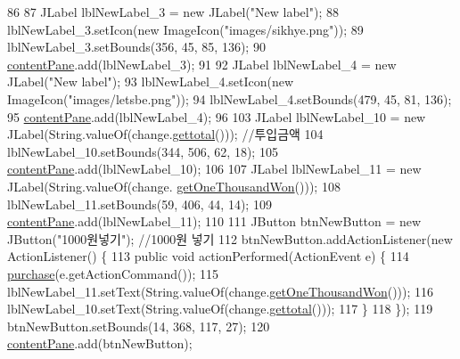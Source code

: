 \begin{DoxyCode}
86         
87         JLabel lblNewLabel\_3 = \textcolor{keyword}{new} JLabel(\textcolor{stringliteral}{"New label"});
88         lblNewLabel\_3.setIcon(\textcolor{keyword}{new} ImageIcon(\textcolor{stringliteral}{"images/sikhye.png"}));
89         lblNewLabel\_3.setBounds(356, 45, 85, 136);
90         \hyperlink{class_vending_machine_1_1_machine_u_i_ac8ef25585e46da798d067af0eefa1a03}{contentPane}.add(lblNewLabel\_3);
91         
92         JLabel lblNewLabel\_4 = \textcolor{keyword}{new} JLabel(\textcolor{stringliteral}{"New label"});
93         lblNewLabel\_4.setIcon(\textcolor{keyword}{new} ImageIcon(\textcolor{stringliteral}{"images/letsbe.png"}));
94         lblNewLabel\_4.setBounds(479, 45, 81, 136);
95         \hyperlink{class_vending_machine_1_1_machine_u_i_ac8ef25585e46da798d067af0eefa1a03}{contentPane}.add(lblNewLabel\_4);  
96         
103         JLabel lblNewLabel\_10 = \textcolor{keyword}{new} JLabel(String.valueOf(change.\hyperlink{class_vending_machine_1_1_change_a07a32d7240178343fa1273d075d73c64}{gettotal}())); \textcolor{comment}{//투입금액}
104         lblNewLabel\_10.setBounds(344, 506, 62, 18);
105         \hyperlink{class_vending_machine_1_1_machine_u_i_ac8ef25585e46da798d067af0eefa1a03}{contentPane}.add(lblNewLabel\_10);     
106         
107         JLabel lblNewLabel\_11 = \textcolor{keyword}{new} JLabel(String.valueOf(change.
      \hyperlink{class_vending_machine_1_1_change_a4207ff32f227afb89076b87a3812cf2e}{getOneThousandWon}()));
108         lblNewLabel\_11.setBounds(59, 406, 44, 14);
109         \hyperlink{class_vending_machine_1_1_machine_u_i_ac8ef25585e46da798d067af0eefa1a03}{contentPane}.add(lblNewLabel\_11);
110         
111         JButton btnNewButton = \textcolor{keyword}{new} JButton(\textcolor{stringliteral}{"1000원넣기"}); \textcolor{comment}{//1000원 넣기}
112         btnNewButton.addActionListener(\textcolor{keyword}{new} ActionListener() \{
113             \textcolor{keyword}{public} \textcolor{keywordtype}{void} actionPerformed(ActionEvent e) \{
114                 \hyperlink{class_vending_machine_1_1_machine_u_i_aadccf593dc69281c9ebbfe1fbe09b804}{purchase}(e.getActionCommand());
115                 lblNewLabel\_11.setText(String.valueOf(change.\hyperlink{class_vending_machine_1_1_change_a4207ff32f227afb89076b87a3812cf2e}{getOneThousandWon}()));
116                 lblNewLabel\_10.setText(String.valueOf(change.\hyperlink{class_vending_machine_1_1_change_a07a32d7240178343fa1273d075d73c64}{gettotal}()));
117             \}
118         \});
119         btnNewButton.setBounds(14, 368, 117, 27);
120         \hyperlink{class_vending_machine_1_1_machine_u_i_ac8ef25585e46da798d067af0eefa1a03}{contentPane}.add(btnNewButton);

\end{DoxyCode}
